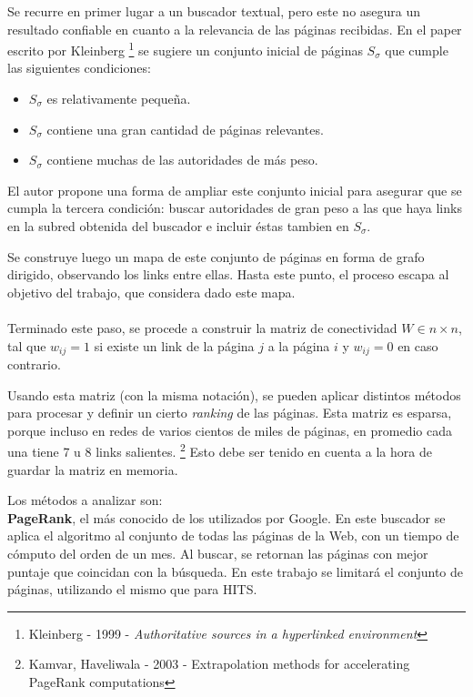 \documentclass[a4paper]{article}
\begin{document}
Se recurre en primer lugar a un buscador textual, pero este no asegura un resultado confiable en cuanto a la relevancia de las páginas recibidas. En el paper escrito por Kleinberg \footnote{Kleinberg - 1999 - \textit{Authoritative sources in a hyperlinked environment}} se sugiere un conjunto inicial de páginas $S_{\sigma}$ que cumple las siguientes condiciones:

\begin{itemize}

\item $S_{\sigma}$ es relativamente pequeña.
\item $S_{\sigma}$ contiene una gran cantidad de p\'{a}ginas relevantes.
\item $S_{\sigma}$ contiene muchas de las autoridades de m\'{a}s peso.

\end{itemize}

El autor propone una forma de ampliar este conjunto inicial para asegurar que se cumpla la tercera condición: buscar autoridades de gran peso a las que haya links en la subred obtenida del buscador e incluir \'{e}stas tambien en $S_{\sigma}$. 

Se construye luego un mapa de este conjunto de páginas en forma de grafo dirigido, observando los links entre ellas. Hasta este punto, el proceso escapa al objetivo del trabajo, que considera dado este mapa.\\ \\

Terminado este paso, se procede a construir la matriz de conectividad $W \in n \times n$, tal que $w_{ij}=1$ si existe un link de la página $j$ a la página $i$ y $w_{ij}=0$ en caso contrario. 

Usando esta matriz (con la misma notación), se pueden aplicar distintos m\'{e}todos para procesar y definir un cierto \textit{ranking} de las p\'{a}ginas.
Esta matriz es esparsa, porque incluso en redes de varios cientos de miles de páginas, en promedio cada una tiene 7 u 8 links salientes. \footnote{Kamvar, Haveliwala - 2003 - Extrapolation methods for accelerating PageRank computations}
Esto debe ser tenido en cuenta a la hora de guardar la matriz en memoria.

Los métodos a analizar son: \\


\textbf{PageRank}, el más conocido de los utilizados por Google. En este buscador se aplica el algoritmo al conjunto de todas las páginas de la Web, con un tiempo de cómputo del orden de un mes. Al buscar, se retornan las páginas con mejor puntaje que coincidan con la búsqueda. En este trabajo se limitará el conjunto de páginas, utilizando el mismo que para HITS.
\end{document}
